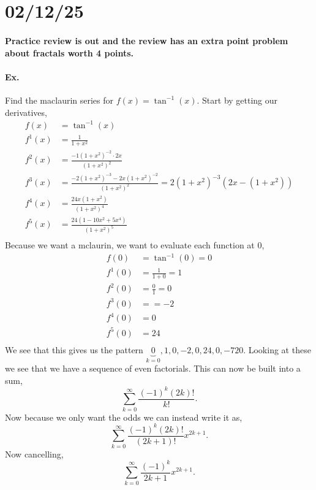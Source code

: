 \section*{02/12/25}%
\label{sec:02/12/25}
\paragraph{Practice review is out and the review has an extra point problem about fractals worth 4 points. }

\begin{exampleblock}{}
	\paragraph{Ex.}
	Find the maclaurin series for $ f\left( x \right) = \tan^{ -1 } \left( x \right)  $. Start by getting our derivatives,
	\begin{align*}
		f\left( x \right) &= \tan^{ -1 } \left( x \right) \\
		f^{ 1 }\left( x \right) &= \frac{ 1 }{ 1+x^2 } \\
		f^{ 2 }\left( x \right) &= \frac{ -1\left( 1+x^2 \right) ^{ -2 }\cdot 2x }{ \left( 1+x^2 \right) ^2 } \\
		f^{ 3 }\left( x \right) &= \frac{ -2\left( 1+x^2 \right)^{ -3 } -2x\left( 1+x^2 \right)^{ -2 }  }{ \left( 1+x^2 \right) ^2 } = 2\left( 1+x^2 \right) ^{ -3 }\left( 2x-\left( 1+x^2 \right) \right) \\
		f^{ 4 }\left( x \right) &=  \frac{ 24x\left( 1+x^2 \right)  }{ \left( 1+x^2 \right) ^{ 4 } }  \\
		f^{ 5 }\left( x \right) &= \frac{ 24\left( 1-10x^2+5x^{ 4 } \right)  }{ \left( 1+x^2 \right) ^{ 5 } } \\
	\end{align*}
	Because we want a mclaurin, we want to evaluate each function at 0,
	\begin{align*}
		f\left( 0 \right) &= \tan^{ -1 } \left( 0 \right) = 0 \\
		f^{ 1 }\left( 0 \right) &= \frac{ 1 }{ 1+0 } = 1 \\
		f^{ 2 }\left( 0 \right) &= \frac{ 0 }{ 1 } = 0 \\
		f^{ 3 }\left( 0 \right) &= = -2 \\
		f^{ 4 }\left( 0 \right) &= 0 \\
		f^{ 5 }\left( 0 \right) &= 24 \\
	\end{align*}
	We see that this gives us the pattern $ \underbrace{ 0 }_{ k=0 } ,1,0,-2,0,24,0,-720 $. Looking at these we see that we have a sequence of even factorials. This can now be built into a sum,
	\[
	\sum_{ k=0 } ^{ \infty } \frac{ \left( -1 \right) ^{ k }\left( 2k \right) ! }{ k! }
	.\] 
	Now because we only want the odds we can instead write it as,
	\[
	\sum_{ k=0 } ^{ \infty } \frac{ \left( -1 \right) ^{ k }\left( 2k \right) ! }{ \left(2k+1\right)! }x^{ 2k+1 }
	.\] 
	Now cancelling,
	\[
	\sum_{ k=0 } ^{ \infty } \frac{ \left( -1 \right) ^{ k } }{ 2k+1 }x^{ 2k+1 }
	.\] 

\end{exampleblock}
